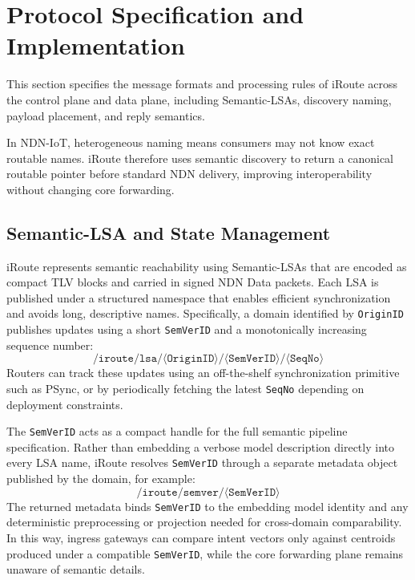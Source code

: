 \documentclass[journal]{IEEEtran}
\newcommand{\sysname}{iRoute}
\begin{document}
\section{Protocol Specification and Implementation}
\label{sec:spec}

This section specifies the message formats and processing rules of \sysname{} across the control plane and data plane, including Semantic-LSAs, discovery naming, payload placement, and reply semantics.

In NDN-IoT, heterogeneous naming means consumers may not know exact routable names. \sysname{} therefore uses semantic discovery to return a canonical routable pointer before standard NDN delivery, improving interoperability without changing core forwarding.

\subsection{Semantic-LSA and State Management}
\label{sec:spec_control}

\sysname{} represents semantic reachability using Semantic-LSAs that are encoded as compact TLV blocks and carried in signed NDN Data packets.
Each LSA is published under a structured namespace that enables efficient synchronization and avoids long, descriptive names.
Specifically, a domain identified by \texttt{OriginID} publishes updates using a short \texttt{SemVerID} and a monotonically increasing sequence number:
\[
\texttt{/iroute/lsa/}\langle\texttt{OriginID}\rangle\texttt{/}\langle\texttt{SemVerID}\rangle\texttt{/}\langle\texttt{SeqNo}\rangle
\]
Routers can track these updates using an off-the-shelf synchronization primitive such as PSync, or by periodically fetching the latest \texttt{SeqNo} depending on deployment constraints.

The \texttt{SemVerID} acts as a compact handle for the full semantic pipeline specification.
Rather than embedding a verbose model description directly into every LSA name, \sysname{} resolves \texttt{SemVerID} through a separate metadata object published by the domain, for example:
\[
\texttt{/iroute/semver/}\langle\texttt{SemVerID}\rangle
\]
The returned metadata binds \texttt{SemVerID} to the embedding model identity and any deterministic preprocessing or projection needed for cross-domain comparability.
In this way, ingress gateways can compare intent vectors only against centroids produced under a compatible \texttt{SemVerID}, while the core forwarding plane remains unaware of semantic details.
\end{document}
